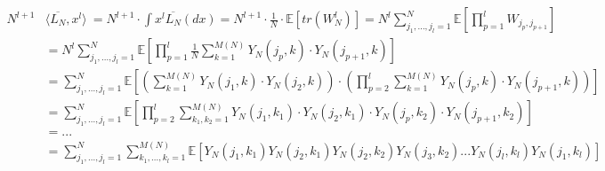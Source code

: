 \documentclass[a4paper, 11pt]{scrreprt}
\newenvironment{beweis}[1][Beweis]{\begin{trivlist}
	\item[\hskip \labelsep {\bfseries #1}]}
	{\end{trivlist}}
\newcommand{\EE}{\mathbb{E}}
\begin{document}
\newpage
\begin{beweis}
\begin{align*}
		N^{l+1} &\langle \overline{L_N}, x^l \rangle\ 
		= N^{l+1} \cdot \int x^l \overline{L_N}(dx) 
		= N^{l+1} \cdot \frac{1}{N} \cdot \EE[tr(W^l_N)] 
		= N^l \sum_{j_1,...,j_l = 1}^N \EE\left[\prod_{p = 1}^l W_{j_p,j_{p+1}}\right] \\
		&= N^l \sum_{j_1,...,j_l = 1}^N \EE\left[\prod_{p = 1}^l \frac{1}{N} \sum_{k = 1}^{M(N)} Y_N(j_p,k) \cdot Y_N(j_{p+1},k) \right] \\
		&= \sum_{j_1,...,j_l = 1}^N \EE \left[\left(\sum_{k = 1}^{M(N)} Y_N(j_1,k) \cdot Y_N(j_2,k)\right) \cdot \left(\prod_{p = 2}^l \sum_{k = 1}^{M(N)} Y_N(j_p,k) \cdot Y_N(j_{p+1},k) \right) \right] \\
		&= \sum_{j_1,...,j_l = 1}^N \EE\left[	\prod_{p = 2}^l \sum_{k_1,k_2 = 1}^{M(N)} Y_N(j_1,k_1) \cdot Y_N(j_2,k_1) \cdot Y_N(j_p,k_2) \cdot Y_N(j_{p+1},k_2) \right] \\
		&= ... \\
		&= \sum_{j_1,...,j_l = 1}^N \sum_{k_1,...,k_l = 1}^{M(N)} \EE[Y_N(j_1,k_1) Y_N(j_2,k_1) Y_N(j_2,k_2) Y_N(j_3,k_2) ... Y_N(j_l,k_l) Y_N(j_1,k_l)]
\end{align*}



\end{beweis}
\end{document}
